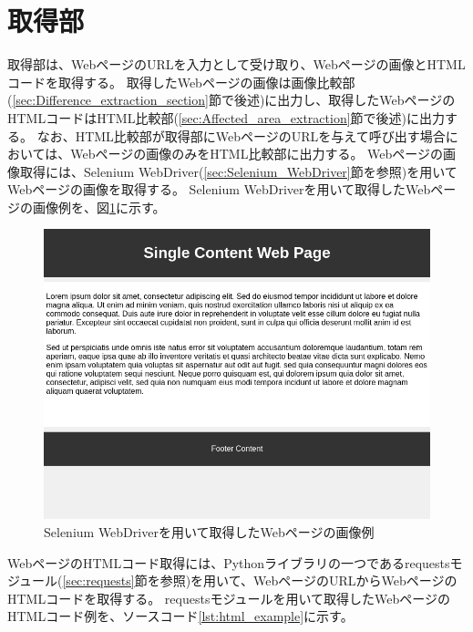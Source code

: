 \section{取得部}\label{sec:Web_data_get_section}
取得部は、WebページのURLを入力として受け取り、Webページの画像とHTMLコードを取得する。
取得したWebページの画像は画像比較部(\ref{sec:Difference_extraction_section}節で後述)に出力し、取得したWebページのHTMLコードはHTML比較部(\ref{sec:Affected_area_extraction}節で後述)に出力する。
なお、HTML比較部が取得部にWebページのURLを与えて呼び出す場合においては、Webページの画像のみをHTML比較部に出力する。
Webページの画像取得には、Selenium WebDriver(\ref{sec:Selenium_WebDriver}節を参照)を用いてWebページの画像を取得する。
Selenium WebDriverを用いて取得したWebページの画像例を、図\ref{fig:4_get_images}に示す。
\begin{figure}[tp]
    \begin{center}
        \includegraphics[width=1.0\columnwidth]{image/4_get_images.png}
        \caption{Selenium WebDriverを用いて取得したWebページの画像例}
        \label{fig:4_get_images}
    \end{center}
\end{figure}
WebページのHTMLコード取得には、Pythonライブラリの一つであるrequestsモジュール(\ref{sec:requests}節を参照)を用いて、WebページのURLからWebページのHTMLコードを取得する。
requestsモジュールを用いて取得したWebページのHTMLコード例を、ソースコード\ref{lst:html_example}に示す。
